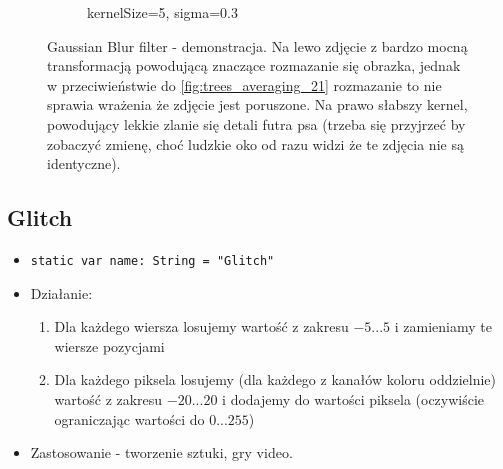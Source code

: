 \documentclass[a4paper]{article}
\begin{document}
\begin{figure}[H]
\begin{subfigure}{0.2\textwidth}
        \caption{kernelSize=5, sigma=0.3}
        \label{fig:dog_gaussian_5_0}
    \end{subfigure}
    \caption{Gaussian Blur filter - demonstracja. Na lewo zdjęcie z bardzo mocną transformacją powodującą znaczące rozmazanie się obrazka, jednak w przeciwieństwie do \ref{fig:trees_averaging_21} rozmazanie to nie sprawia wrażenia że zdjęcie jest poruszone. Na prawo słabszy kernel, powodujący lekkie zlanie się detali futra psa (trzeba się przyjrzeć by zobaczyć zmienę, choć ludzkie oko od razu widzi że te zdjęcia nie są identyczne).}
    \label{fig:gaussian}
\end{figure}

\subsection{Glitch}

\begin{itemize}
    \item \texttt{static var name: String = "Glitch"}
    \item Działanie:
          \begin{enumerate}
              \item Dla każdego wiersza losujemy wartość z zakresu $-5...5$ i zamieniamy te wiersze pozycjami
              \item Dla każdego piksela losujemy (dla każdego z kanałów koloru oddzielnie) wartość z zakresu $-20...20$ i dodajemy do wartości piksela (oczywiście ograniczając wartości do $0...255$)
          \end{enumerate}
    \item Zastosowanie - tworzenie sztuki, gry video.
\end{itemize}
\end{document}
